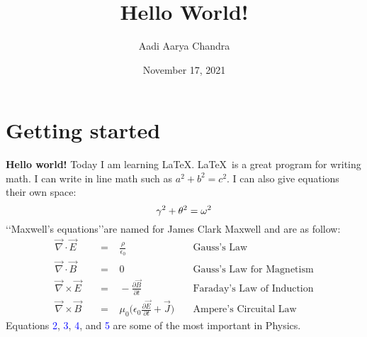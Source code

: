 \documentclass{article} %
\begin{document}
\title{Hello World!}		%
\author{Aadi Aarya Chandra}	%
\date{November 17, 2021} 	%
\maketitle
\thispagestyle{empty}		%
\section{Getting started}	%
\textbf{Hello world!} Today I am learning \LaTeX. \LaTeX\ is a great program for writing math. I can write in line math such as $a^2 + b^2 = c^2$. I can also give equations their own space: %
\begin{equation} 
\gamma^2 + \theta^2 = \omega^2 \\
\end{equation} %
\lq\lq Maxwell's equations\rq\rq \;are named for James Clark Maxwell and are as follow: %
\begin{align}
\vec{\nabla} \cdot \vec{E}  \;\;\; &= \;\;\; \frac{\rho}{\epsilon_0} && \; \text {Gauss's Law}\\
\vec{\nabla} \cdot \vec{B} \;\;\; &= \;\;\; 0 && \; \text {Gauss's Law for Magnetism}\\
\vec{\nabla} \times \vec{E}  \;\;\; &= \;\;\;  -\frac{\partial \vec{B}}{\partial t} && \; \text {Faraday's Law of Induction}\\
\vec{\nabla} \times \vec{B}  \;\;\; &= \;\;\; \mu_0\biggl(\epsilon_0\frac{\partial \vec{E}}{\partial t} + \vec{J}\biggr)&& \; \text {Ampere's Circuital Law}
\end{align} %
Equations \textcolor{blue}{2}, \textcolor{blue}{3}, \textcolor{blue}{4}, and \textcolor{blue}{5} are some of the most important in Physics.\\ %
\end{document}
